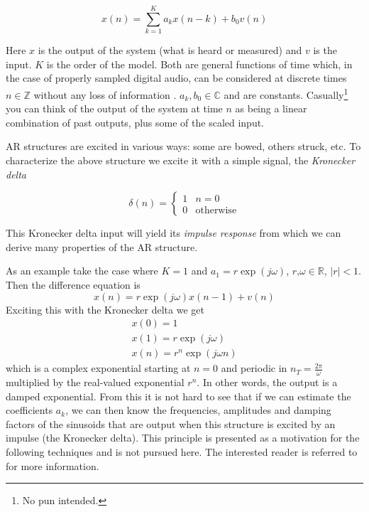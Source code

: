 \begin{equation}
    x(n) = \sum_{k=1}^{K} a_k x(n-k) + b_0 v(n)
\end{equation}

Here $x$ is the output of the system (what is heard or measured) and $v$ is the
input. $K$ is the order of the model. Both are general functions of time which,
in the case of properly sampled digital audio, can be considered at discrete
times $n \in \mathbb{Z}$ without any loss of information
\cite[ch.~2]{crochiere1983multi}.  $a_k,b_0 \in \mathbb{C}$ and are constants.
Casually\footnote{No pun intended.} you can think of the output of the system at
time $n$ as being a linear combination of past outputs, plus some of the scaled
input.

AR structures are excited in various ways: some are bowed, others struck, etc.
To characterize the above structure we excite it with a simple signal, the
\textit{Kronecker delta}

\begin{equation}
    \delta(n) = \begin{cases}
        1 & n=0\\
        0 & \text{otherwise}
    \end{cases}
\end{equation}

This Kronecker delta input will yield its \textit{impulse
response} from which we can derive many properties of the AR structure.

As an example take the case where $K=1$ and $a_1 = r \exp(j\omega)$, 
$r\text{,}\omega \in \mathbb{R}$, $|r|<1$. Then the difference equation is
\begin{equation}
    x(n) = r \exp(j\omega) x(n-1) + v(n)
\end{equation}
Exciting this with the Kronecker delta we get
\begin{equation}
    \begin{array}{c}
        x(0) = 1 \\
        x(1) = r \exp(j\omega) \\
        x(n) = r^n \exp(j\omega n)
    \end{array}
\end{equation}
which is a complex exponential starting at $n=0$ and periodic in
$n_T=\frac{2\pi}{\omega}$ multiplied by the real-valued
exponential $r^n$. In other words, the output is a damped exponential. From this
it is not hard to see that if we can estimate the coefficients $a_k$, we can
then know the frequencies, amplitudes and damping factors of the sinusoids that
are output when this structure is excited by an impulse (the Kronecker delta).
This principle is presented as a motivation for the following techniques and is
not pursued here. The interested reader is referred to \cite{makhoul1975linear}
for more information.

